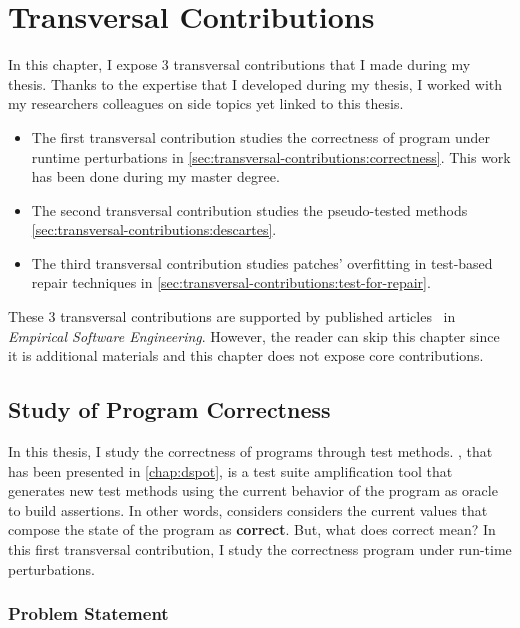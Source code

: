 \chapter{Transversal Contributions}
\label{chap:transversal-contributions}

\minitoc

\graphicspath{{.}{chapitres/transversal_contributions/}}

In this chapter, I expose 3 transversal contributions that I made during my thesis.
Thanks to the expertise that I developed during my thesis, I worked with my researchers colleagues on side topics yet linked to this thesis.
\begin{itemize}
	\item The first transversal contribution studies the correctness of program under runtime perturbations in \autoref{sec:transversal-contributions:correctness}.
	This work has been done during my master degree.
	\item The second transversal contribution studies the pseudo-tested methods \autoref{sec:transversal-contributions:descartes}. 
	\item The third transversal contribution studies patches' overfitting in test-based repair techniques in \autoref{sec:transversal-contributions:test-for-repair}.
\end{itemize}
These 3 transversal contributions are supported by published articles~\cite{Danglot2018,descartes,Yu2019} in \emph{Empirical Software Engineering}.
However, the reader can skip this chapter since it is additional materials and this chapter does not expose core contributions.

\section{Study of Program Correctness}
\label{sec:transversal-contributions:correctness}

In this thesis, I study the correctness of programs through test methods.
\dspot, that has been presented in \autoref{chap:dspot}, is a test suite amplification tool that generates new test methods using the current behavior of the program as oracle to build assertions.
In other words, \dspot considers considers the current values that compose the state of the program as \textbf{correct}.
But, what does correct mean? In this first transversal contribution, I study the correctness program under run-time perturbations.

\subsection{Problem Statement}
\label{subsec:transversal-contributions:correctness:introduction}

